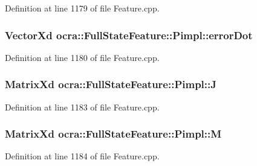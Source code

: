 Definition at line 1179 of file Feature.\+cpp.

\subsubsection[{\texorpdfstring{error\+Dot}{errorDot}}]{\setlength{\rightskip}{0pt plus 5cm}Vector\+Xd ocra\+::\+Full\+State\+Feature\+::\+Pimpl\+::error\+Dot}\hypertarget{structocra_1_1FullStateFeature_1_1Pimpl_aea594214dbcf9bd9c7fb28b16593df7e}{}\label{structocra_1_1FullStateFeature_1_1Pimpl_aea594214dbcf9bd9c7fb28b16593df7e}


Definition at line 1180 of file Feature.\+cpp.

\subsubsection[{\texorpdfstring{J}{J}}]{\setlength{\rightskip}{0pt plus 5cm}Matrix\+Xd ocra\+::\+Full\+State\+Feature\+::\+Pimpl\+::J}\hypertarget{structocra_1_1FullStateFeature_1_1Pimpl_aaf69c11e2ad69ab31c1b6614dec068bd}{}\label{structocra_1_1FullStateFeature_1_1Pimpl_aaf69c11e2ad69ab31c1b6614dec068bd}


Definition at line 1183 of file Feature.\+cpp.

\subsubsection[{\texorpdfstring{M}{M}}]{\setlength{\rightskip}{0pt plus 5cm}Matrix\+Xd ocra\+::\+Full\+State\+Feature\+::\+Pimpl\+::M}\hypertarget{structocra_1_1FullStateFeature_1_1Pimpl_ae2b1ab14e57380beb59d953ab4e72045}{}\label{structocra_1_1FullStateFeature_1_1Pimpl_ae2b1ab14e57380beb59d953ab4e72045}


Definition at line 1184 of file Feature.\+cpp.

